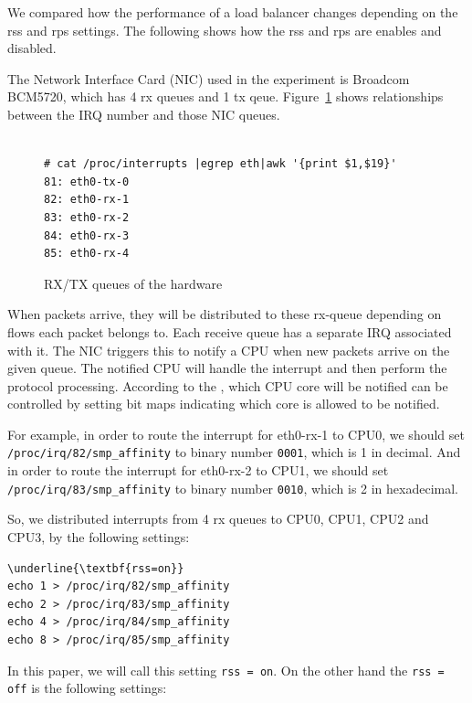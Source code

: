 We compared how the performance of a load balancer changes depending on the rss and rps settings.
The following shows how the rss and rps are enables and disabled. 

The Network Interface Card (NIC) used in the experiment is Broadcom BCM5720, which has 4 rx queues and 1 tx qeue.
Figure~\ref{fig:rx-queue} shows relationships between the IRQ number and those NIC queues.
 
\begin{figure}
\begin{minipage}{0.8\columnwidth}
\small
\begin{verbatim}

# cat /proc/interrupts |egrep eth|awk '{print $1,$19}'
81: eth0-tx-0
82: eth0-rx-1
83: eth0-rx-2
84: eth0-rx-3
85: eth0-rx-4

\end{verbatim}
\end{minipage}
\caption{RX/TX queues of the hardware}
\label{fig:rx-queue}
\end{figure}

When packets arrive, they will be distributed to these rx-queue depending on flows each packet belongs to.
Each receive queue has a separate IRQ associated with it. The NIC triggers
this to notify a CPU when new packets arrive on the given queue.
The notified CPU will handle the interrupt and then perform the protocol processing. 
According to the \cite{TomHerbert}, which CPU core will be notified can be controlled by setting 
bit maps indicating which core is allowed to be notified.

For example, in order to route the interrupt for eth0-rx-1 to CPU0, we should set {\tt /proc/irq/82/smp\_affinity} 
to binary number {\tt 0001}, which is 1 in decimal.
And in order to route the interrupt for eth0-rx-2 to CPU1, we should set {\tt /proc/irq/83/smp\_affinity} 
to binary number {\tt 0010}, which is 2 in hexadecimal.


So, we distributed interrupts from 4 rx queues to CPU0, CPU1, CPU2 and CPU3, by the following settings: 

\begin{Verbatim}[commandchars=\\\{\}]
\underline{\textbf{rss=on}}
echo 1 > /proc/irq/82/smp_affinity
echo 2 > /proc/irq/83/smp_affinity
echo 4 > /proc/irq/84/smp_affinity
echo 8 > /proc/irq/85/smp_affinity
\end{Verbatim}

In this paper, we will call this setting {\tt rss = on}.
On the other hand the {\tt rss = off} is the following settings:

